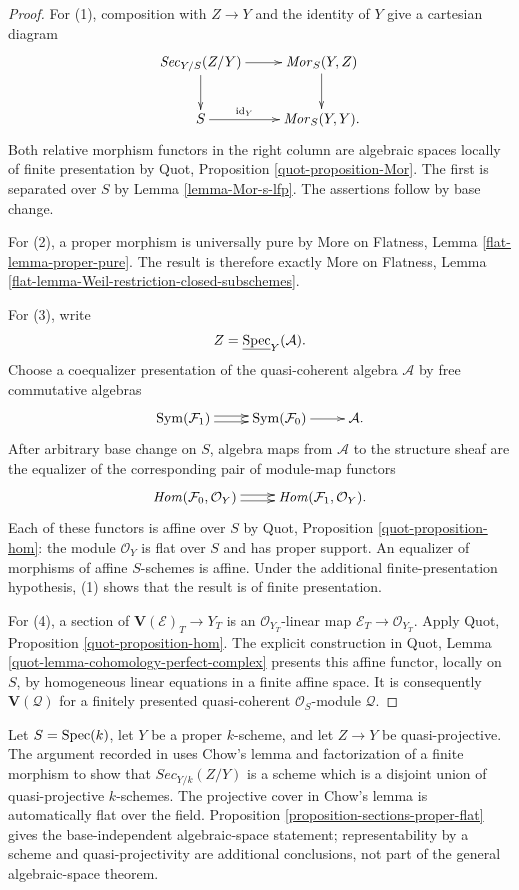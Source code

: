 \begin{proof}
For (1), composition with $Z \to Y$ and the identity of $Y$ give a
cartesian diagram
$$
\xymatrix{
\mathit{Sec}_{Y/S}(Z/Y) \ar[r] \ar[d] &
\mathit{Mor}_S(Y, Z) \ar[d] \\
S \ar[r]^-{\operatorname{id}_Y} & \mathit{Mor}_S(Y, Y).
}
$$
Both relative morphism functors in the right column are algebraic spaces
locally of finite presentation by Quot, Proposition
\ref{quot-proposition-Mor}. The first is separated over $S$ by Lemma
\ref{lemma-Mor-s-lfp}. The assertions follow by base change.

For (2), a proper morphism is universally pure by More on Flatness, Lemma
\ref{flat-lemma-proper-pure}. The result is therefore exactly More on
Flatness, Lemma
\ref{flat-lemma-Weil-restriction-closed-subschemes}.

For (3), write
$$
Z = \underline{\mathop{\mathrm{Spec}}}_Y(\mathcal{A}).
$$
Choose a coequalizer presentation of the quasi-coherent algebra
$\mathcal{A}$ by free commutative algebras
$$
\xymatrix{
\operatorname{Sym}(\mathcal{F}_1)
\ar@<0.5ex>[r] \ar@<-0.5ex>[r] &
\operatorname{Sym}(\mathcal{F}_0) \ar[r] & \mathcal{A}.
}
$$
After arbitrary base change on $S$, algebra maps from $\mathcal{A}$ to the
structure sheaf are the equalizer of the corresponding pair of module-map
functors
$$
\xymatrix{
\mathit{Hom}(\mathcal{F}_0, \mathcal{O}_Y)
\ar@<0.5ex>[r] \ar@<-0.5ex>[r] &
\mathit{Hom}(\mathcal{F}_1, \mathcal{O}_Y).
}
$$
Each of these functors is affine over $S$ by Quot, Proposition
\ref{quot-proposition-hom}: the module $\mathcal{O}_Y$ is flat over $S$ and
has proper support. An equalizer of morphisms of affine $S$-schemes is
affine. Under the additional finite-presentation hypothesis, (1) shows that
the result is of finite presentation.

For (4), a section of $\mathbf{V}(\mathcal{E})_T \to Y_T$ is an
$\mathcal{O}_{Y_T}$-linear map
$\mathcal{E}_T \to \mathcal{O}_{Y_T}$. Apply Quot, Proposition
\ref{quot-proposition-hom}. The explicit construction in Quot, Lemma
\ref{quot-lemma-cohomology-perfect-complex} presents this affine functor,
locally on $S$, by homogeneous linear equations in a finite affine space.
It is consequently $\mathbf{V}(\mathcal{Q})$ for a finitely presented
quasi-coherent $\mathcal{O}_S$-module $\mathcal{Q}$.
\end{proof}

\begin{remark}
\label{remark-sections-proper-field-quasi-projective}
Let $S = \mathop{\mathrm{Spec}}(k)$, let $Y$ be a proper $k$-scheme, and let $Z \to Y$ be
quasi-projective. The argument recorded in
\cite[Expos\'e 221, Section 7]{FGA} uses Chow's lemma and factorization of a
finite morphism to show that $\mathit{Sec}_{Y/k}(Z/Y)$ is a scheme which is
a disjoint union of quasi-projective $k$-schemes. The projective cover in
Chow's lemma is automatically flat over the field. Proposition
\ref{proposition-sections-proper-flat} gives the base-independent
algebraic-space statement; representability by a scheme and
quasi-projectivity are additional conclusions, not part of the general
algebraic-space theorem.
\end{remark}

